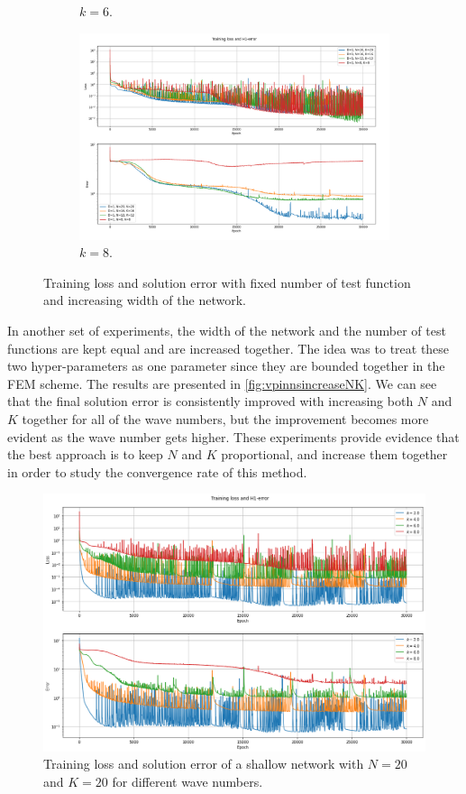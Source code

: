\begin{figure}[h!]
\begin{subfigure}[b]{0.48\textwidth}
        \caption{$k=6$.}
        \label{fig:vpinnsk6increaseNK}
    \end{subfigure}
    \hfill
    \begin{subfigure}[b]{0.48\textwidth}
        \includegraphics[width=\textwidth]{img/VPINN-Comparison-k8increaseNK.png}
        \caption{$k=8$.}
        \label{fig:vpinnsk8increaseNK}
    \end{subfigure}
    \caption{Training loss and solution error with fixed number of test function and increasing width of the network.}
    \label{fig:vpinnsincreaseNK}
\end{figure}

In another set of experiments, the width of the network and the number of test functions are kept equal and are increased together. The idea was to treat these two hyper-parameters as one parameter since they are bounded together in the FEM scheme. The results are presented in \autoref{fig:vpinnsincreaseNK}. We can see that the final solution error is consistently improved with increasing both $N$ and $K$ together for all of the wave numbers, but the improvement becomes more evident as the wave number gets higher. These experiments provide evidence that the best approach is to keep $N$ and $K$ proportional, and increase them together in order to study the convergence rate of this method.

\begin{figure}[h!]
    \centering
    \includegraphics[width=.48\textwidth]{img/VPINN-Comparison-NK20increasek.png}
    \caption{Training loss and solution error of a shallow network with $N=20$ and $K=20$ for different wave numbers.}
    \label{fig:vpinnsincreasefreq}
\end{figure}


